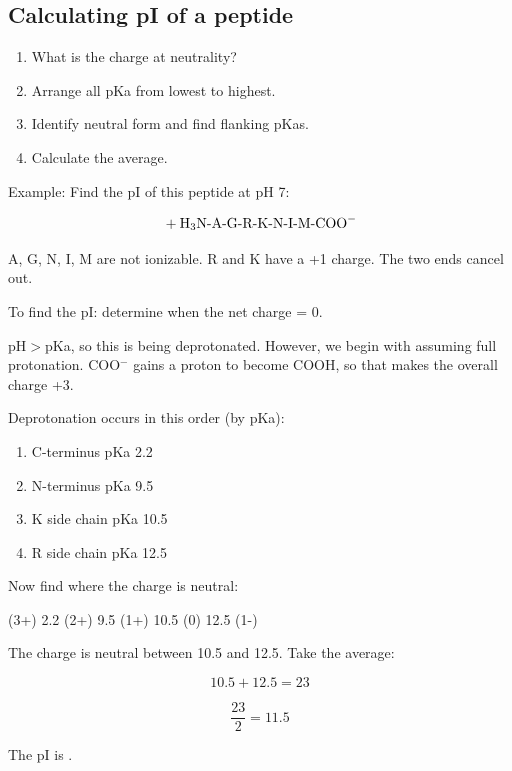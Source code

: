 \documentclass[letterpaper, 12pt]{article}
\begin{document}
\subsection*{Calculating pI of a peptide}

\begin{enumerate}
\item What is the charge at neutrality?
\item Arrange all pKa from lowest to highest.
\item Identify neutral form and find flanking pKas.
\item Calculate the average.
\end{enumerate}

Example: Find the pI of this peptide at pH 7:

$$\ce{+H3N}\text{-A-G-R-K-N-I-M-}\ce{COO-}$$

A, G, N, I, M are not ionizable. R and K have a +1 charge. The two ends cancel out.

To find the pI: determine when the net charge = 0.

pH$>$pKa, so this is being deprotonated. However, we begin with assuming full protonation. COO$^-$ gains a proton to become COOH, so that makes the overall charge +3.

Deprotonation occurs in this order (by pKa):

\begin{enumerate}
\item C-terminus pKa 2.2
\item N-terminus pKa 9.5
\item K side chain pKa 10.5
\item R side chain pKa 12.5
\end{enumerate}

Now find where the charge is neutral:

(3+) 2.2 (2+) 9.5 (1+) 10.5 (0) 12.5 (1-)

The charge is neutral between 10.5 and 12.5. Take the average:

$$ 10.5 + 12.5 = 23 $$

$$\frac{23}{2} = 11.5$$

The pI is .
\end{document}
